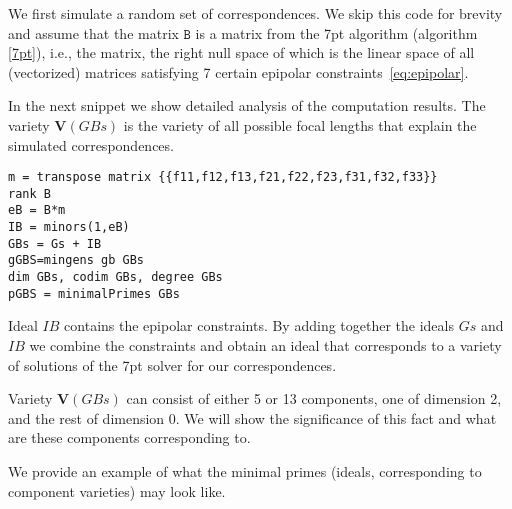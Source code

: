 




We first simulate a random set of correspondences. We skip this code for brevity and assume that the matrix $\mathtt{B}$ is a matrix from the 7pt algorithm (algorithm \ref{7pt}), i.e., the matrix, the right null space of which is the linear space of all (vectorized) matrices satisfying 7 certain epipolar constraints~\ref{eq:epipolar}. 

In the next snippet we show detailed analysis of the computation results. The variety $\textbf{V}(GBs)$ is the variety of all possible focal lengths that explain the simulated correspondences.

\begin{verbatim}
m = transpose matrix {{f11,f12,f13,f21,f22,f23,f31,f32,f33}}
rank B
eB = B*m
IB = minors(1,eB)
GBs = Gs + IB
gGBS=mingens gb GBs
dim GBs, codim GBs, degree GBs
pGBS = minimalPrimes GBs
\end{verbatim}

Ideal $IB$ contains the epipolar constraints. By adding together the ideals $Gs$ and $IB$ we combine the constraints and obtain an ideal that corresponds to a variety of solutions of the 7pt solver for our correspondences.

Variety $\textbf{V}(GBs)$ can consist of either 5 or 13 components, one of dimension 2, and the rest of dimension 0. We will show the significance of this fact and what are these components corresponding to.

We provide an example of what the minimal primes (ideals, corresponding to component varieties) may look like. 

